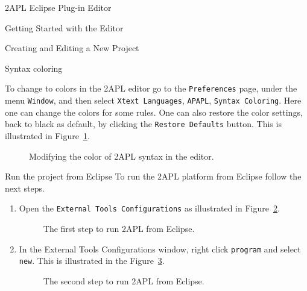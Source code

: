 \begin{chapter}{2APL Eclipse Plug-in Editor}
\begin{section}{Getting Started with the Editor}
\begin{subsection}{Creating and Editing a New Project}
\begin{enumerate}
\end{enumerate}
\end{subsection}

\end{section}


\begin{section}{Syntax coloring}

To change to colors in the 2APL editor go to the
\texttt{Preferences} page, under the menu \texttt{Window}, and then
select \texttt{Xtext Languages}, \texttt{APAPL}, \texttt{Syntax
Coloring}. Here one can change the colors for some rules. One can
also restore the color settings, back to black as default, by
clicking the \texttt{Restore Defaults} button. This is illustrated
in Figure~\ref{fig:coloring}.

        \begin{figure}[ht]
            \begin{center}
            \end{center}\label{fig:color1}
            \caption{Modifying the color of 2APL syntax in the editor.}\label{fig:coloring}
        \end{figure}

\end{section}


\begin{section}{Run the project from Eclipse}
    To run the 2APL platform from Eclipse follow the next steps.
    \begin{enumerate}
    \item Open the \texttt{External Tools Configurations} as
    illustrated in Figure~\ref{fig:runconfiguration}.
        \begin{figure}[ht]
            \begin{center}
            \end{center}
            \caption{The first step to run 2APL from Eclipse.}\label{fig:runconfiguration}
        \end{figure}

    \item In the External Tools Configurations window, right click \texttt{program} and select
    \texttt{new}. This is illustrated in the Figure~\ref{fig:runconfiguration1}.
        \begin{figure}[ht]
            \begin{center}
            \end{center}
            \caption{The second step to run 2APL from Eclipse.}\label{fig:runconfiguration1}
        \end{figure}


\end{enumerate}
\end{section}
\end{chapter}
